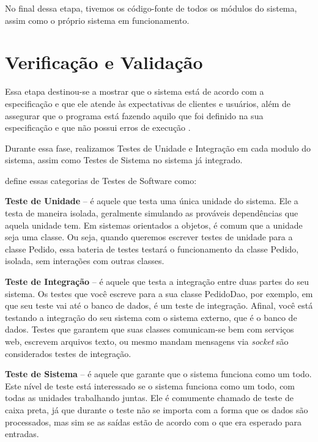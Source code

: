 No final dessa etapa, tivemos os código-fonte de todos os módulos do sistema, assim como o próprio sistema em funcionamento. 

\section{Verificação e Validação}
Essa etapa destinou-se a mostrar que o sistema está de acordo com a especificação e que ele atende às expectativas de clientes e usuários, al\'em de assegurar que o  programa está fazendo aquilo que foi definido na sua especificação e que não possui  erros  de execução \cite{aguiar2012requisitos}. 

Durante essa fase, realizamos Testes de Unidade e Integra\c{c}\~ao em cada modulo do sistema, assim como Testes de Sistema no sistema j\'a integrado.

 define essas categorias de Testes de Software como:

\begin{alineascomponto}
	\item \textbf{Teste de Unidade} -- é aquele que testa uma única unidade do sistema. Ele a testa de maneira isolada, geralmente simulando as 
prováveis dependências que aquela unidade tem. Em sistemas orientados a objetos, é comum que a unidade seja uma classe. Ou seja, quando 
queremos escrever testes de unidade para a classe Pedido, essa bateria de testes testará o funcionamento da classe Pedido, 
isolada, sem interações com outras classes.
	\item \textbf{Teste de Integração} -- é aquele que testa a integração entre duas partes do seu sistema. Os testes que você escreve para a sua 
classe PedidoDao, por exemplo, em que seu teste vai até o banco de dados, é um teste de integração. Afinal, você está testando a integração 
do seu sistema com o sistema externo, que é o banco de dados. Testes que garantem que suas classes comunicam-se bem 
com serviços web, escrevem arquivos texto, ou mesmo mandam mensagens via \textit{socket} são considerados testes de integração.
	\item \textbf{Teste de Sistema} -- \'e aquele que garante que o sistema funciona como um todo. Este 
nível de teste está interessado se o sistema funciona como um todo, com todas as 
unidades trabalhando juntas. Ele é comumente chamado de teste de caixa preta, já 
que durante o teste n\~ao se importa com a forma que os dados s\~ao processados, mas sim se as sa\'idas est\~ao de acordo com o que era esperado para entradas. 
\end{alineascomponto}

